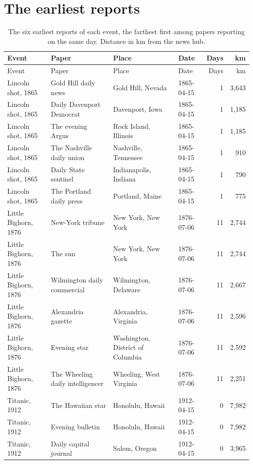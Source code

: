 \documentclass[11pt,a4paper]{article}
\begin{document}
\section{The earliest reports}
{\footnotesize\begin{longtable}{p{2.6cm}p{4.6cm}p{3.6cm}lrr}\caption{The six earliest reports of each event, the farthest first among papers reporting on the same day. Distance in km from the news hub.}\\\toprule Event & Paper & Place & Date & Days & km\\\midrule\endfirsthead\toprule Event & Paper & Place & Date & Days & km\\\midrule\endhead
Lincoln shot, 1865 & Gold Hill daily news & Gold Hill, Nevada & 1865-04-15 & 1 & 3,643\\
Lincoln shot, 1865 & Daily Davenport Democrat & Davenport, Iowa & 1865-04-15 & 1 & 1,185\\
Lincoln shot, 1865 & The evening Argus & Rock Island, Illinois & 1865-04-15 & 1 & 1,185\\
Lincoln shot, 1865 & The Nashville daily union & Nashville, Tennessee & 1865-04-15 & 1 & 910\\
Lincoln shot, 1865 & Daily State sentinel & Indianapolis, Indiana & 1865-04-15 & 1 & 790\\
Lincoln shot, 1865 & The Portland daily press & Portland, Maine & 1865-04-15 & 1 & 775\\
\midrule
Little Bighorn, 1876 & New-York tribune & New York, New York & 1876-07-06 & 11 & 2,744\\
Little Bighorn, 1876 & The sun & New York, New York & 1876-07-06 & 11 & 2,744\\
Little Bighorn, 1876 & Wilmington daily commercial & Wilmington, Delaware & 1876-07-06 & 11 & 2,667\\
Little Bighorn, 1876 & Alexandria gazette & Alexandria, Virginia & 1876-07-06 & 11 & 2,596\\
Little Bighorn, 1876 & Evening star & Washington, District of Columbia & 1876-07-06 & 11 & 2,592\\
Little Bighorn, 1876 & The Wheeling daily intelligencer & Wheeling, West Virginia & 1876-07-06 & 11 & 2,251\\
\midrule
Titanic, 1912 & The Hawaiian star & Honolulu, Hawaii & 1912-04-15 & 0 & 7,982\\
Titanic, 1912 & Evening bulletin & Honolulu, Hawaii & 1912-04-15 & 0 & 7,982\\
Titanic, 1912 & Daily capital journal & Salem, Oregon & 1912-04-15 & 0 & 3,965\\

\end{longtable}}
\end{document}
